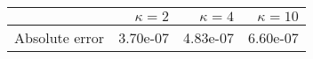 \begin{tabular}{lrrr}
\toprule
 & $\kappa = 2$ & $\kappa = 4$ & $\kappa = 10$ \\
\midrule
Absolute error & 3.70e-07 & 4.83e-07 & 6.60e-07 \\
\bottomrule
\end{tabular}
